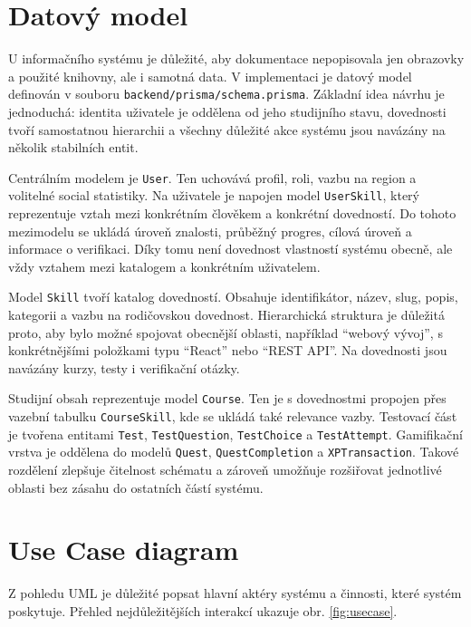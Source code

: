 \documentclass[12pt,a4paper]{report}
\begin{document}
\section{Datový model}
U informačního systému je důležité, aby dokumentace nepopisovala jen obrazovky a použité knihovny, ale i samotná data. V implementaci je datový model definován v souboru \texttt{backend/prisma/schema.prisma}. Základní idea návrhu je jednoduchá: identita uživatele je oddělena od jeho studijního stavu, dovednosti tvoří samostatnou hierarchii a všechny důležité akce systému jsou navázány na několik stabilních entit.

Centrálním modelem je \texttt{User}. Ten uchovává profil, roli, vazbu na region a volitelné social statistiky. Na uživatele je napojen model \texttt{UserSkill}, který reprezentuje vztah mezi konkrétním člověkem a konkrétní dovedností. Do tohoto mezimodelu se ukládá úroveň znalosti, průběžný progres, cílová úroveň a informace o verifikaci. Díky tomu není dovednost vlastností systému obecně, ale vždy vztahem mezi katalogem a konkrétním uživatelem.

Model \texttt{Skill} tvoří katalog dovedností. Obsahuje identifikátor, název, slug, popis, kategorii a vazbu na rodičovskou dovednost. Hierarchická struktura je důležitá proto, aby bylo možné spojovat obecnější oblasti, například ``webový vývoj'', s konkrétnějšími položkami typu ``React'' nebo ``REST API''. Na dovednosti jsou navázány kurzy, testy i verifikační otázky.

Studijní obsah reprezentuje model \texttt{Course}. Ten je s dovednostmi propojen přes vazební tabulku \texttt{CourseSkill}, kde se ukládá také relevance vazby. Testovací část je tvořena entitami \texttt{Test}, \texttt{TestQuestion}, \texttt{TestChoice} a \texttt{TestAttempt}. Gamifikační vrstva je oddělena do modelů \texttt{Quest}, \texttt{QuestCompletion} a \texttt{XPTransaction}. Takové rozdělení zlepšuje čitelnost schématu a zároveň umožňuje rozšiřovat jednotlivé oblasti bez zásahu do ostatních částí systému.

\section{Use Case diagram}
Z pohledu UML je důležité popsat hlavní aktéry systému a činnosti, které systém poskytuje. Přehled nejdůležitějších interakcí ukazuje obr. \ref{fig:usecase}.
\end{document}

